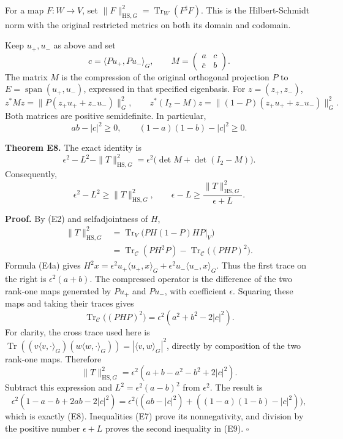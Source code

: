 For a map \(F:W\to V\), set \(\|F\|_{\mathrm{HS},G}^2=\operatorname{Tr}_W(F^\sharp F)\). This is the Hilbert-Schmidt norm with the original restricted metrics on both its domain and codomain.

Keep \(u_+,u_-\) as above and set
\[
c=\langle Pu_+,Pu_-\rangle_G,
\qquad M=\begin{pmatrix}a&c\\\overline c&b\end{pmatrix}.
\tag{E5}
\]
The matrix \(M\) is the compression of the original orthogonal projection \(P\) to \(E=\operatorname{span}(u_+,u_-)\), expressed in that specified eigenbasis. For \(z=(z_+,z_-)\),
\[
z^*Mz=\|P(z_+u_++z_-u_-)\|_G^2,
\qquad
z^*(I_2-M)z=\|(1-P)(z_+u_++z_-u_-)\|_G^2.
\tag{E6}
\]
Both matrices are positive semidefinite. In particular,
\[
ab-|c|^2\geq0,
\qquad (1-a)(1-b)-|c|^2\geq0.
\tag{E7}
\]

\textbf{Theorem E8.} The exact identity is
\[
\boxed{\quad
\epsilon^2-L^2-\|T\|_{\mathrm{HS},G}^2
 =\epsilon^2\bigl(\det M+\det(I_2-M)\bigr).
\quad}
\tag{E8}
\]
Consequently,
\[
\boxed{\quad
\epsilon^2-L^2\geq\|T\|_{\mathrm{HS},G}^2,
\qquad
\epsilon-L\geq\frac{\|T\|_{\mathrm{HS},G}^2}{\epsilon+L}.
\quad}
\tag{E9}
\]

\textbf{Proof.} By (E2) and selfadjointness of \(H\),
\[
\begin{aligned}
\|T\|_{\mathrm{HS},G}^2
 &=\operatorname{Tr}_V\bigl(PH(1-P)HP|_V\bigr)\\
 &=\operatorname{Tr}_{\mathcal C}(PH^2P)
   -\operatorname{Tr}_{\mathcal C}\bigl((PHP)^2\bigr).
\end{aligned}
\tag{E10}
\]
Formula (E4a) gives \(H^2x=\epsilon^2u_+\langle u_+,x\rangle_G+\epsilon^2u_-\langle u_-,x\rangle_G\). Thus the first trace on the right is \(\epsilon^2(a+b)\). The compressed operator is the difference of the two rank-one maps generated by \(Pu_+\) and \(Pu_-\), with coefficient \(\epsilon\). Squaring these maps and taking their traces gives
\[
\operatorname{Tr}_{\mathcal C}\bigl((PHP)^2\bigr)
 =\epsilon^2(a^2+b^2-2|c|^2).
\]
For clarity, the cross trace used here is
\(\operatorname{Tr}((v\langle v,\cdot\rangle_G)(w\langle w,\cdot\rangle_G))=|\langle v,w\rangle_G|^2\), directly by composition of the two rank-one maps. Therefore
\[
\|T\|_{\mathrm{HS},G}^2
 =\epsilon^2(a+b-a^2-b^2+2|c|^2).
\tag{E11}
\]
Subtract this expression and \(L^2=\epsilon^2(a-b)^2\) from \(\epsilon^2\). The result is
\[
\epsilon^2(1-a-b+2ab-2|c|^2)
 =\epsilon^2\bigl((ab-|c|^2)+((1-a)(1-b)-|c|^2)\bigr),
\]
which is exactly (E8). Inequalities (E7) prove its nonnegativity, and division by the positive number \(\epsilon+L\) proves the second inequality in (E9). \(\square\)

